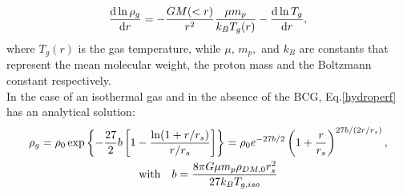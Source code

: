 \documentclass{article}
\begin{document}
\begin{equation}\label{hydroperf}
	\derivative{\ln \rho_{g}}{r}=-\frac{GM(<r)}{r^{2}}\frac{\mu m_{p}}{k_{B}T_{g}(r)}-\derivative{\ln T_{g}}{r},
\end{equation}
where $T_{g}(r)$ is the gas temperature, while $\mu ,\, m_{p},$ and $k_{B}$ are constants that represent the mean molecular weight, the proton mass and the Boltzmann constant respectively.\\
In the case of an isothermal gas and in the absence of the BCG, Eq.\eqref{hydroperf} has an analytical solution:
	\begin{gather}\label{isogas}
		\rho_{g}=\rho_{0}\exp\left\{-\frac{27}{2}b\left[1-\frac{\ln (1+r/r_{s})}{r/r_{s}}\right]\right\}=\rho_{0}e^{-27b/2}\left(1+\frac{r}{r_{s}}\right)^{27b/(2r/r_{s})},\\
	\text{with} \quad b=\frac{8\pi G\mu m_{p}\rho_{DM,0}r_{s}^{2}}{27k_{B}T_{g,iso}}\notag
	\end{gather}
\end{document}
